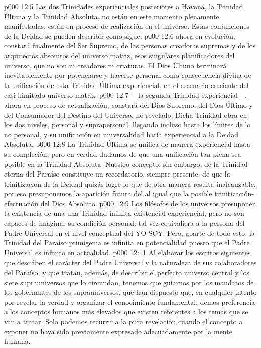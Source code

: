 \vs p000 12:5 \pc Las dos Trinidades experienciales posteriores a Havona, la Trinidad Última y la Trinidad Absoluta, no están en este momento plenamente manifestadas; están en proceso de realización en el universo. Estas conjunciones de la Deidad se pueden describir como sigue:
\vs p000 12:6  ahora en evolución, constará finalmente del Ser Supremo, de las personas creadoras supremas y de los arquitectos absonitos del universo matriz, esos singulares planificadores del universo, que no son ni creadores ni criaturas. El Dios Último terminará inevitablemente por potenciarse y hacerse personal como consecuencia divina de la unificación de esta Trinidad Última experiencial, en el escenario creciente del casi ilimitado universo matriz.
\vs p000 12:7  ---la segunda Trinidad experiencial---, ahora en proceso de actualización, constará del Dios Supremo, del Dios Último y del Consumador del Destino del Universo, no revelado. Dicha Trinidad obra en los dos niveles, personal y suprapersonal, llegando incluso hasta los límites de lo no personal, y su unificación en universalidad haría experiencial a la Deidad Absoluta.
\vs p000 12:8 \pc La Trinidad Última se unifica de manera experiencial hasta su compleción, pero en verdad dudamos de que una unificación tan plena sea posible en la Trinidad Absoluta. Nuestro concepto, sin embargo, de la Trinidad eterna del Paraíso constituye un recordatorio, siempre presente, de que la trinitización de la Deidad quizás logre lo que de otra manera resulta inalcanzable; por eso presuponemos la aparición futura del  al igual que la posible trinitización\hyp{}efectuación del Dios Absoluto.
\vs p000 12:9 \pc Los filósofos de los universos presuponen la existencia de una  una Trinidad infinita existencial\hyp{}experiencial, pero no son capaces de imaginar su condición personal; tal vez equivaliera a la persona del Padre Universal en el nivel conceptual del YO SOY. Pero, aparte de todo esto, la Trinidad del Paraíso primigenia es infinita en potencialidad puesto que el Padre Universal es infinito en actualidad.
\vs p000 12:11 Al elaborar los escritos siguientes que describen el carácter del Padre Universal y la naturaleza de sus colaboradores del Paraíso, y que tratan, además, de describir el perfecto universo central y los siete suprauniversos que lo circundan, tenemos que guiarnos por los mandatos de los gobernantes de los suprauniversos, que han dispuesto que, en cualquier intento por revelar la verdad y organizar el conocimiento fundamental, demos preferencia a los conceptos humanos más elevados que existen referentes a los temas que se van a tratar. Solo podemos recurrir a la pura revelación cuando el concepto a exponer no haya sido previamente expresado adecuadamente por la mente humana.
